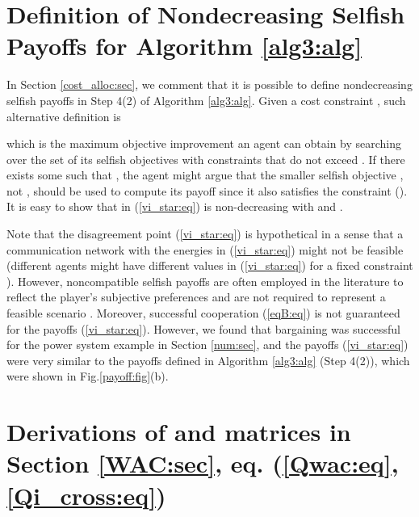 \documentclass[12pt, draftclsnofoot,onecolumn]{IEEEtran}
\begin{document}





















\appendices


\section{Definition of Nondecreasing Selfish Payoffs for Algorithm \ref{alg3:alg}}

\label{B:appendix}
In Section \ref{cost_alloc:sec}, we comment that it is possible to define nondecreasing selfish payoffs in Step 4(2) of Algorithm \ref{alg3:alg}. Given a cost constraint , such alternative definition is 


\noindent which is the maximum objective improvement an agent  can obtain by searching over the set of its selfish objectives  with constraints  that do not exceed . If there exists some  such that , the agent  might argue that the smaller selfish objective , not , should be used to compute its payoff since it also satisfies the constraint (). It is easy to show that  in (\ref{vi_star:eq}) is non-decreasing with  and . 



 Note that the disagreement point (\ref{vi_star:eq}) is hypothetical in a sense that a communication network with the energies  in (\ref{vi_star:eq}) might not be feasible (different agents might have different  values in (\ref{vi_star:eq}) for a fixed constraint ). However, noncompatible selfish payoffs are often employed in the literature to reflect the player's subjective preferences and are not required to represent a feasible scenario \cite{Avrachenkov2015265,kawamori2016nash}. Moreover, successful cooperation ({\ref{eqB:eq}}) is not guaranteed for the payoffs (\ref{vi_star:eq}). However, we found that bargaining was successful for the power system example in Section \ref{num:sec}, and the payoffs ({\ref{vi_star:eq}}) were very similar to the payoffs  defined in Algorithm {\ref{alg3:alg}} (Step 4(2)), which were shown in Fig.{\ref{payoff:fig}}(b).


\newpage
\section{Derivations of  and  matrices in Section \ref{WAC:sec}, eq. (\ref{Qwac:eq},\ref{Qi_cross:eq})}
\end{document}
